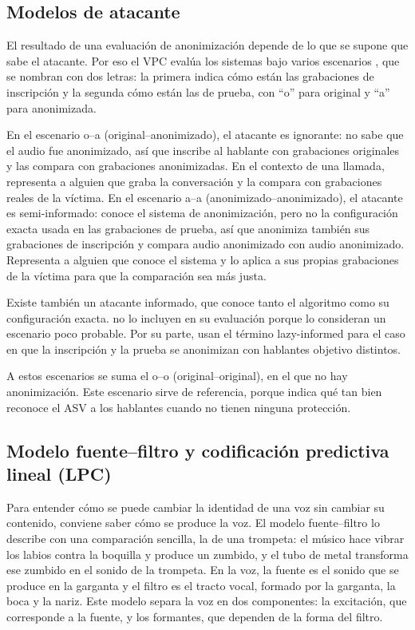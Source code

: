 \documentclass[10pt,twocolumn]{article}
\newcommand{\textcite}[1]{\citet{#1}}
\newcommand{\parencite}[1]{\citep{#1}}
\begin{document}
\subsection{Modelos de atacante}\label{sec:2.5}

El resultado de una evaluación de anonimización depende de lo que se supone que sabe el atacante. Por eso el VPC evalúa los sistemas bajo varios escenarios \parencite{patino2021,tomashenko2024}, que se nombran con dos letras: la primera indica cómo están las grabaciones de inscripción y la segunda cómo están las de prueba, con ``o'' para original y ``a'' para anonimizada.

En el escenario o--a (original--anonimizado), el atacante es ignorante: no sabe que el audio fue anonimizado, así que inscribe al hablante con grabaciones originales y las compara con grabaciones anonimizadas. En el contexto de una llamada, representa a alguien que graba la conversación y la compara con grabaciones reales de la víctima. En el escenario a--a (anonimizado--anonimizado), el atacante es semi-informado: conoce el sistema de anonimización, pero no la configuración exacta usada en las grabaciones de prueba, así que anonimiza también sus grabaciones de inscripción y compara audio anonimizado con audio anonimizado. Representa a alguien que conoce el sistema y lo aplica a sus propias grabaciones de la víctima para que la comparación sea más justa.

Existe también un atacante informado, que conoce tanto el algoritmo como su configuración exacta. \textcite{patino2021} no lo incluyen en su evaluación porque lo consideran un escenario poco probable. Por su parte, \textcite{quamer2024} usan el término lazy-informed para el caso en que la inscripción y la prueba se anonimizan con hablantes objetivo distintos.

A estos escenarios se suma el o--o (original--original), en el que no hay anonimización. Este escenario sirve de referencia, porque indica qué tan bien reconoce el ASV a los hablantes cuando no tienen ninguna protección.

\subsection{Modelo fuente--filtro y codificación predictiva lineal (LPC)}\label{sec:2.6}

Para entender cómo se puede cambiar la identidad de una voz sin cambiar su contenido, conviene saber cómo se produce la voz. El modelo fuente--filtro \parencite{fant1971} lo describe con una comparación sencilla, la de una trompeta: el músico hace vibrar los labios contra la boquilla y produce un zumbido, y el tubo de metal transforma ese zumbido en el sonido de la trompeta. En la voz, la fuente es el sonido que se produce en la garganta y el filtro es el tracto vocal, formado por la garganta, la boca y la nariz. Este modelo separa la voz en dos componentes: la excitación, que corresponde a la fuente, y los formantes, que dependen de la forma del filtro.
\end{document}
